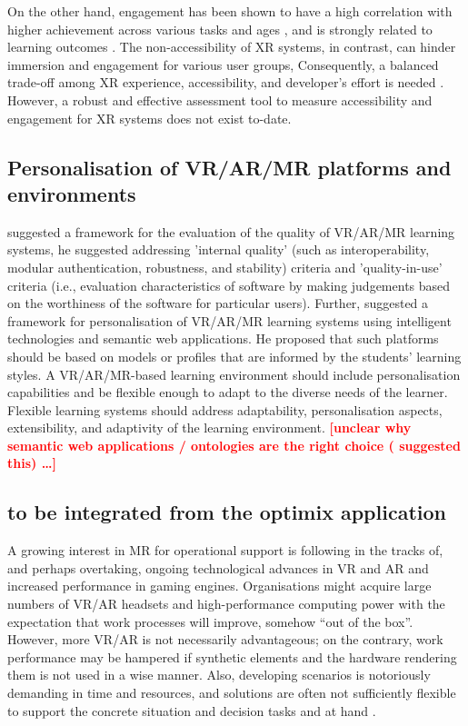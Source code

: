 \documentclass[11pt,english]{nik}
\newcommand{\WVL}[1]{\textbf{\textcolor{red}{#1}}}
\begin{document}
On the other hand, engagement has been shown to have a high correlation with higher achievement across various tasks and
ages \autocite{doi:10.3102/00346543074001059}, and is strongly related to learning
outcomes \autocite{doi:10.1080/13527250410001692877}. The non-accessibility of XR systems, in contrast, can
hinder immersion and engagement for various user groups, Consequently, a balanced trade-off among XR experience,
accessibility, and developer’s effort is needed \autocite{zhao2019seeingvr}. 
However, a robust and effective assessment tool to measure
accessibility and engagement for XR systems does not exist to-date.

\subsection{Personalisation of VR/AR/MR platforms and environments} 
\citet{kurilovasEvaluationQualityPersonalisation2016}  suggested a framework for the evaluation of the quality of VR/AR/MR learning systems, he suggested addressing 'internal quality' (such as interoperability, modular authentication, robustness, and stability) criteria and 'quality-in-use' criteria (i.e., evaluation characteristics of software by making judgements based on the worthiness of the software for particular users). 
Further, \citeauthor{kurilovasEvaluationQualityPersonalisation2016} suggested a framework for personalisation 
of VR/AR/MR learning systems using intelligent technologies and semantic web applications. 
He proposed that such platforms should be based on models or profiles that are informed by the students' learning styles. 
A VR/AR/MR-based learning environment should include personalisation capabilities and be flexible enough to adapt to the diverse needs of the learner. 
Flexible learning systems should address adaptability, personalisation aspects, extensibility, and adaptivity of the learning environment. 
\WVL{[unclear why semantic web applications / ontologies are the right choice (\citeauthor{kurilovasEvaluationQualityPersonalisation2016} suggested this) \dots]}

\subsection{to be integrated from the optimix application}

A growing interest in MR for operational support is following in the tracks of, and perhaps overtaking, ongoing technological advances in VR and AR and increased performance in gaming engines. Organisations might acquire large numbers of VR/AR headsets and high-performance computing power with the expectation that work processes will improve, somehow “out of the box”. However, more VR/AR is not necessarily advantageous; on the contrary, work performance may be hampered if synthetic elements and the hardware rendering them is not used in a wise manner. Also, developing scenarios is notoriously demanding in time and resources, and solutions are often not sufficiently flexible to support the concrete situation and decision tasks and at hand \autocite{hannay-vandenBerg-NATO-2017}.
\end{document}
